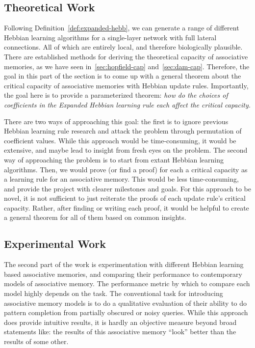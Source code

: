 \documentclass{article}
\theoremstyle{definition}
\begin{document}
\subsection{Theoretical Work}\label{subsec:theoretical}

Following Definition~\ref{def:expanded-hebb}, we can generate a range of
different Hebbian learning algorithms for a single-layer
network with full lateral connections. All of which are entirely local,
and therefore biologically plausible. There are established methods for
deriving the theoretical capacity of associative memories, as we have
seen in~\autoref{sec:hopfield-cap} and~\autoref{sec:dam-cap}. Therefore,
the goal in this part of the section is to come up with a general theorem
about the critical capacity of associative memories with Hebbian update
rules.
Importantly, the goal here is to provide a parameterized theorem: \textit{how
  do the choices of coefficients in the Expanded Hebbian learning rule
each affect the critical capacity.}

There are two ways of approaching this goal: the first is to ignore
previous Hebbian learning rule research and attack the problem through
permutation of coefficient values. While this approach would be time-consuming,
it would be extensive, and maybe lead to insight from fresh eyes on the problem.
The second way of approaching the problem is to start from extant Hebbian
learning algorithms. Then, we would prove (or find a proof)
for each a critical capacity as a learning rule for an associative memory. This
would be less time-consuming, and provide the project with clearer milestones
and goals. For this approach to be novel, it is not sufficient to just
reiterate the proofs of each update rule's critical capacity. Rather,
after finding or writing each proof, it would be helpful to create a general
theorem for all of them based on common insights.

\subsection{Experimental Work}\label{subsec:experimental}

The second part of the work is experimentation with different Hebbian
learning based associative memories, and comparing their performance to
contemporary models of associative memory. The performance metric by which
to compare each model highly depends on the task. The conventional task
for introducing associative memory models is to do a qualitative evaluation
of their ability to do pattern completion from partially obscured or noisy
queries. While this approach does provide intuitive results, it is hardly
an objective measure beyond broad statements like: the results of
this associative memory ``look'' better than the results of some other.
\end{document}
